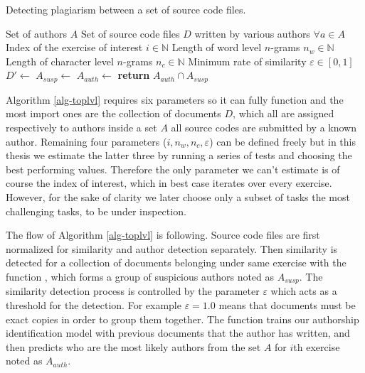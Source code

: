 \begin{algorithm}[ht]
\caption{Detecting plagiarism between a set of source code files.}
\label{alg-toplvl}
\begin{algorithmic}

\Require Set of authors $A$
\Require Set of source code files $D$ written by various authors $\forall a \in A$
\Require Index of the exercise of interest $i \in \mathbb{N}$
\Require Length of word level $n$-grams $n_w \in \mathbb{N}$
\Require Length of character level $n$-grams $n_c \in \mathbb{N}$
\Require Minimum rate of similarity $\varepsilon \in [0, 1]$
   \State $D'\gets$ 
   \State $A_{susp} \gets$ 
   \State $A_{auth} \gets$ 
   \State \textbf{return} $A_{auth} \cap A_{susp}$
\EndProcedure

\end{algorithmic}
\end{algorithm}

\noindent
Algorithm \ref{alg-toplvl} requires six parameters so it can fully function and the most import ones are the collection of documents $D$, which all are assigned respectively to authors inside a set $A$ \ie all source codes are submitted by a known author. Remaining four parameters ($i, n_w, n_c, \varepsilon$) can be defined freely but in this thesis we estimate the latter three by running a series of tests and choosing the best performing values. Therefore the only parameter we can't estimate is of course the index of interest, which in best case iterates over every exercise. However, for the sake of clarity we later choose only a subset of tasks \eg the most challenging tasks, to be under inspection.   

The flow of Algorithm \ref{alg-toplvl} is following. Source code files are first normalized for similarity and author detection separately. Then similarity is detected for a collection of documents belonging under same exercise with the function , which forms a group of suspicious authors noted as $A_{susp}$. The similarity detection process is controlled by the parameter $\varepsilon$ which acts as a threshold for the detection. For example $\varepsilon = 1.0$ means that documents must be exact copies in order to group them together. The function  trains our authorship identification model with previous documents that the author has written, and then predicts who are the most likely authors from the set $A$ for $i$th exercise noted as $A_{auth}$. 

